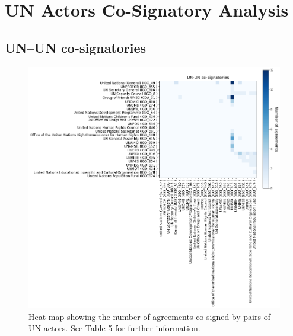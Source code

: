 \documentclass{article}
\begin{document}
\section{UN Actors Co-Signatory Analysis}

\subsection{UN--UN co-signatories}

\begin{figure}[H]
\begin{center}
\includegraphics[scale=0.38]{./assets/figure_2.png}
\caption{Heat map showing the number of agreements co-signed by pairs of UN actors. See Table 5 for further information.}
\end{center}
\end{figure}
\end{document}

